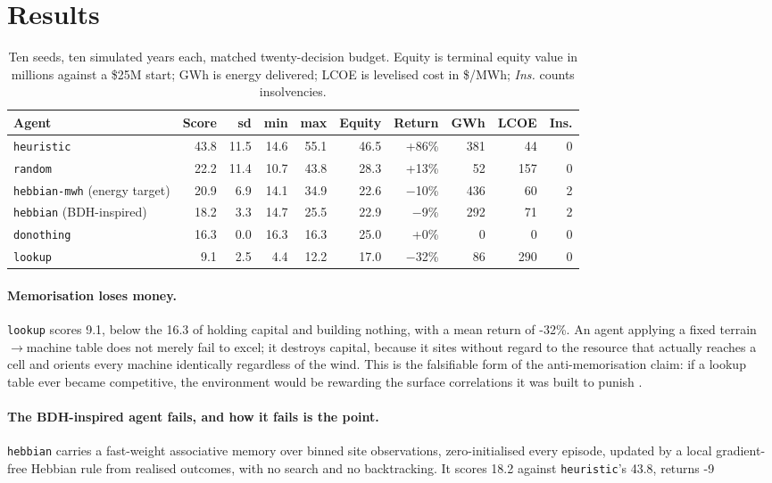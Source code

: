 \section{Results}
\label{sec:results}

\begin{table}[t]
\centering\small
\caption{Ten seeds, ten simulated years each, matched twenty-decision budget.
Equity is terminal equity value in millions against a \$25M start; GWh is energy
delivered; LCOE is levelised cost in \$/MWh; \emph{Ins.} counts insolvencies.}
\label{tab:multi}
\begin{tabular}{lrrrrrrrrr}
\toprule
Agent & Score & sd & min & max & Equity & Return & GWh & LCOE & Ins. \\
\midrule
\texttt{heuristic} & 43.8 & 11.5 & 14.6 & 55.1 & 46.5 & +86\% & 381 & 44 & 0 \\
\texttt{random} & 22.2 & 11.4 & 10.7 & 43.8 & 28.3 & +13\% & 52 & 157 & 0 \\
\texttt{hebbian-mwh} (energy target) & 20.9 & 6.9 & 14.1 & 34.9 & 22.6 & $-$10\% & 436 & 60 & 2 \\
\texttt{hebbian} (BDH-inspired) & 18.2 & 3.3 & 14.7 & 25.5 & 22.9 & $-$9\% & 292 & 71 & 2 \\
\texttt{donothing} & 16.3 & 0.0 & 16.3 & 16.3 & 25.0 & +0\% & 0 & 0 & 0 \\
\texttt{lookup} & 9.1 & 2.5 & 4.4 & 12.2 & 17.0 & $-$32\% & 86 & 290 & 0 \\
\bottomrule
\end{tabular}
\end{table}

\paragraph{Memorisation loses money.} \texttt{lookup} scores 9.1, below the 16.3 of holding capital and building nothing, with a mean return of -32\%. An agent applying a fixed terrain$\rightarrow$machine table does not merely fail to excel; it destroys capital, because it sites without regard to the resource that actually reaches a cell and orients every machine identically regardless of the wind. This is the falsifiable form of the anti-memorisation claim: if a lookup table ever became competitive, the environment would be rewarding the surface correlations it was built to punish \citep{tien2023causal}.

\paragraph{The BDH-inspired agent fails, and how it fails is the point.} \texttt{hebbian} carries a fast-weight associative memory over binned site observations, zero-initialised every episode, updated by a local gradient-free Hebbian rule from realised outcomes, with no search and no backtracking. It scores 18.2 against \texttt{heuristic}'s 43.8, returns -9\\%

